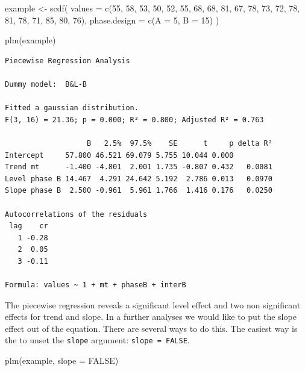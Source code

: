 \documentclass[
]{book}
\newenvironment{Shaded}{\begin{snugshade}}{\end{snugshade}}
\newcommand{\AttributeTok}[1]{\textcolor[rgb]{0.77,0.63,0.00}{#1}}
\newcommand{\ConstantTok}[1]{\textcolor[rgb]{0.00,0.00,0.00}{#1}}
\newcommand{\DecValTok}[1]{\textcolor[rgb]{0.00,0.00,0.81}{#1}}
\newcommand{\FunctionTok}[1]{\textcolor[rgb]{0.00,0.00,0.00}{#1}}
\newcommand{\NormalTok}[1]{#1}
\newcommand{\OtherTok}[1]{\textcolor[rgb]{0.56,0.35,0.01}{#1}}
\begin{document}
\begin{Shaded}
\begin{Highlighting}[]
\NormalTok{example }\OtherTok{\textless{}{-}} \FunctionTok{scdf}\NormalTok{(}
   \AttributeTok{values =} \FunctionTok{c}\NormalTok{(}\DecValTok{55}\NormalTok{, }\DecValTok{58}\NormalTok{, }\DecValTok{53}\NormalTok{, }\DecValTok{50}\NormalTok{, }\DecValTok{52}\NormalTok{, }\DecValTok{55}\NormalTok{, }\DecValTok{68}\NormalTok{, }\DecValTok{68}\NormalTok{, }\DecValTok{81}\NormalTok{, }\DecValTok{67}\NormalTok{, }\DecValTok{78}\NormalTok{, }\DecValTok{73}\NormalTok{, }\DecValTok{72}\NormalTok{, }\DecValTok{78}\NormalTok{, }\DecValTok{81}\NormalTok{, }\DecValTok{78}\NormalTok{, }\DecValTok{71}\NormalTok{, }\DecValTok{85}\NormalTok{, }\DecValTok{80}\NormalTok{, }\DecValTok{76}\NormalTok{),}
   \AttributeTok{phase.design =} \FunctionTok{c}\NormalTok{(}\AttributeTok{A =} \DecValTok{5}\NormalTok{, }\AttributeTok{B =} \DecValTok{15}\NormalTok{)}
\NormalTok{)}

\FunctionTok{plm}\NormalTok{(example)}
\end{Highlighting}
\end{Shaded}

\begin{verbatim}
Piecewise Regression Analysis

Dummy model:  B&L-B 

Fitted a gaussian distribution.
F(3, 16) = 21.36; p = 0.000; R² = 0.800; Adjusted R² = 0.763

                   B   2.5%  97.5%    SE      t     p delta R²
Intercept     57.800 46.521 69.079 5.755 10.044 0.000         
Trend mt      -1.400 -4.801  2.001 1.735 -0.807 0.432   0.0081
Level phase B 14.467  4.291 24.642 5.192  2.786 0.013   0.0970
Slope phase B  2.500 -0.961  5.961 1.766  1.416 0.176   0.0250

Autocorrelations of the residuals
 lag    cr
   1 -0.28
   2  0.05
   3 -0.11

Formula: values ~ 1 + mt + phaseB + interB
\end{verbatim}

The piecewise regression reveals a significant level effect and two non significant effects for trend and slope. In a further analyses we would like to put the slope effect out of the equation. There are several ways to do this. The easiest way is the to unset the \texttt{slope} argument: \texttt{slope\ =\ FALSE}.

\begin{Shaded}
\begin{Highlighting}[]
\FunctionTok{plm}\NormalTok{(example, }\AttributeTok{slope =} \ConstantTok{FALSE}\NormalTok{)}
\end{Highlighting}
\end{Shaded}
\end{document}
